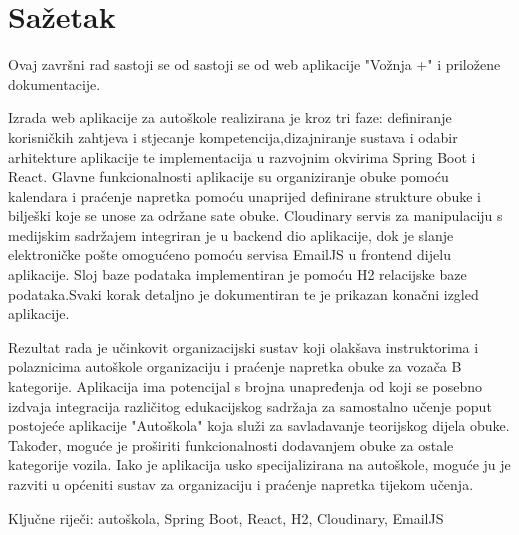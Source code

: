 \chapter*{Sažetak}
\noindent Ovaj završni rad sastoji se od sastoji se od web aplikacije "Vožnja +" i priložene dokumentacije. \

\noindent Izrada web aplikacije za autoškole realizirana je kroz tri faze: definiranje korisničkih zahtjeva i stjecanje kompetencija,dizajniranje sustava i odabir arhitekture aplikacije te implementacija u razvojnim okvirima Spring Boot i React. Glavne funkcionalnosti aplikacije su organiziranje obuke pomoću kalendara i praćenje napretka pomoću unaprijed definirane strukture obuke i bilješki koje se unose za održane sate obuke. Cloudinary servis za manipulaciju s medijskim sadržajem integriran je u backend dio aplikacije, dok je slanje elektroničke pošte omogućeno pomoću servisa EmailJS u frontend dijelu aplikacije. Sloj baze podataka implementiran je pomoću H2 relacijske baze podataka.Svaki korak detaljno je dokumentiran te je prikazan konačni izgled aplikacije.\

\noindent Rezultat rada je učinkovit organizacijski sustav koji olakšava instruktorima i polaznicima autoškole organizaciju i praćenje napretka obuke za vozača B kategorije. Aplikacija ima potencijal s brojna unapređenja od koji se posebno izdvaja integracija različitog edukacijskog sadržaja za samostalno učenje poput postojeće aplikacije  "Autoškola" koja služi za savladavanje teorijskog dijela obuke. Također, moguće je proširiti funkcionalnosti dodavanjem obuke za ostale kategorije vozila. Iako je aplikacija usko specijalizirana na autoškole, moguće ju je razviti u općeniti sustav za organizaciju i praćenje napretka tijekom učenja.

\vspace{1cm}
\noindent Ključne riječi: autoškola, Spring Boot, React, H2, Cloudinary, EmailJS